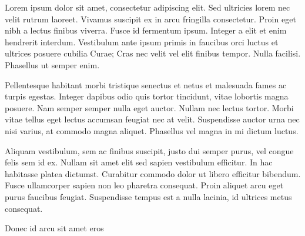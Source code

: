 Lorem ipsum dolor sit amet, consectetur adipiscing elit. Sed ultricies lorem nec velit rutrum laoreet. Vivamus suscipit ex in arcu fringilla consectetur. Proin eget nibh a lectus finibus viverra. Fusce id fermentum ipsum. Integer a elit et enim hendrerit interdum. Vestibulum ante ipsum primis in faucibus orci luctus et ultrices posuere cubilia Curae; Cras nec velit vel elit finibus tempor. Nulla facilisi. Phasellus ut semper enim.

Pellentesque habitant morbi tristique senectus et netus et malesuada fames ac turpis egestas. Integer dapibus odio quis tortor tincidunt, vitae lobortis magna posuere. Nam semper semper nulla eget auctor. Nullam nec lectus tortor. Morbi vitae tellus eget lectus accumsan feugiat nec at velit. Suspendisse auctor urna nec nisi varius, at commodo magna aliquet. Phasellus vel magna in mi dictum luctus.

Aliquam vestibulum, sem ac finibus suscipit, justo dui semper purus, vel congue felis sem id ex. Nullam sit amet elit sed sapien vestibulum efficitur. In hac habitasse platea dictumst. Curabitur commodo dolor ut libero efficitur bibendum. Fusce ullamcorper sapien non leo pharetra consequat. Proin aliquet arcu eget purus faucibus feugiat. Suspendisse tempus est a nulla lacinia, id ultrices metus consequat.

Donec id arcu sit amet eros 
